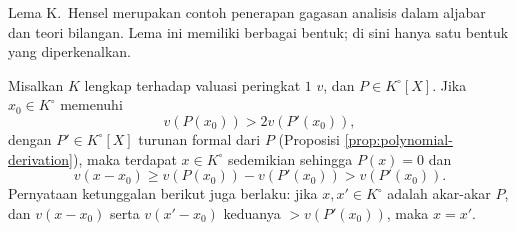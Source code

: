 Lema K.\ Hensel merupakan contoh penerapan gagasan analisis dalam aljabar dan teori bilangan. Lema ini memiliki berbagai bentuk; di sini hanya satu bentuk yang diperkenalkan.
\begin{theorem}\label{prop:Hensel-lemma}
	Misalkan $K$ lengkap terhadap valuasi peringkat $1$ $v$, dan $P \in K^\circ[X]$. Jika $x_0 \in K^\circ$ memenuhi
	\[ v(P(x_0)) > 2v(P'(x_0)), \]
	dengan $P' \in K^\circ[X]$ turunan formal dari $P$ (Proposisi \ref{prop:polynomial-derivation}), maka terdapat $x \in K^\circ$ sedemikian sehingga $P(x) = 0$ dan
	\[ v(x - x_0) \geq v(P(x_0)) - v(P'(x_0)) > v(P'(x_0)). \]
	Pernyataan ketunggalan berikut juga berlaku: jika $x, x' \in K^\circ$ adalah akar-akar $P$, dan $v(x - x_0)$ serta $v(x' - x_0)$ keduanya $> v(P'(x_0))$, maka $x=x'$.
\end{theorem}
